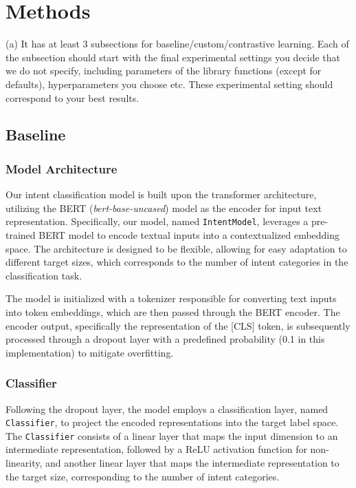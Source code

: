 \section*{Methods}

(a) It has at least 3 subsections for baseline/custom/contrastive learning. Each of the subsection should start with the final experimental settings you decide that we do not specify, including parameters of the library functions (except for defaults), hyperparameters you choose etc. These experimental setting should correspond to your best results.

\subsection*{Baseline}

\subsubsection*{Model Architecture}
Our intent classification model is built upon the transformer architecture, utilizing the BERT (\textit{bert-base-uncased}) model as the encoder for input text representation. Specifically, our model, named \texttt{IntentModel}, leverages a pre-trained BERT model to encode textual inputs into a contextualized embedding space. The architecture is designed to be flexible, allowing for easy adaptation to different target sizes, which corresponds to the number of intent categories in the classification task.

The model is initialized with a tokenizer responsible for converting text inputs into token embeddings, which are then passed through the BERT encoder. The encoder output, specifically the representation of the [CLS] token, is subsequently processed through a dropout layer with a predefined probability (0.1 in this implementation) to mitigate overfitting.

\subsubsection*{Classifier}
Following the dropout layer, the model employs a classification layer, named \texttt{Classifier}, to project the encoded representations into the target label space. The \texttt{Classifier} consists of a linear layer that maps the input dimension to an intermediate representation, followed by a ReLU activation function for non-linearity, and another linear layer that maps the intermediate representation to the target size, corresponding to the number of intent categories.

